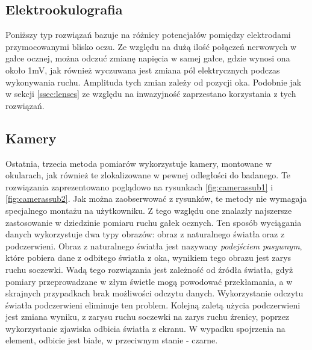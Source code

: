 \subsection{Elektrookulografia}
\label{ssec:eog}
Poniższy typ rozwiązań bazuje na różnicy potencjałów pomiędzy elektrodami przymocowanymi blisko oczu. Ze względu na dużą ilość połączeń nerwowych w gałce ocznej, można odczuć zmianę napięcia w samej gałce, gdzie wynosi ona około 1mV, jak również wyczuwana jest zmiana pól elektrycznych podczas wykonywania ruchu. Amplituda tych zmian zależy od pozycji oka. Podobnie jak w sekcji \ref{ssec:lenses} ze względu na inwazyjność zaprzestano korzystania z tych rozwiązań.
\subsection{Kamery}
\label{ssec:cameras}
Ostatnia, trzecia metoda pomiarów wykorzystuje kamery, montowane w okularach, jak również te zlokalizowane w pewnej odległości do badanego. Te rozwiązania zaprezentowano poglądowo na rysunkach \ref{fig:camerassub1} i \ref{fig:camerassub2}. Jak można zaobserwować z rysunków, te metody nie wymagaja specjalnego montażu na użytkowniku. Z tego względu one znalazły najszersze zastosowanie w dziedzinie pomiaru ruchu gałek ocznych. Ten sposób wyciągania danych wykorzystuje dwa typy obrazów: obraz z naturalnego światła oraz z podczerwieni. Obraz z naturalnego światła jest nazywany \emph{podejściem pasywnym}, które pobiera dane z odbitego światła z oka, wynikiem tego obrazu jest zarys ruchu soczewki. Wadą tego rozwiązania jest zależność od źródła światła, gdyż pomiary przeprowadzane w złym świetle mogą powodować przekłamania, a w skrajnych przypadkach brak możliwości odczytu danych. Wykorzystanie odczytu światła podczerwieni eliminuje ten problem. Kolejną zaletą użycia podczerwieni jest zmiana wyniku, z zarysu ruchu soczewki na zarys ruchu źrenicy, poprzez wykorzystanie zjawiska odbicia światła z ekranu. W wypadku spojrzenia na element, odbicie jest białe, w przeciwnym stanie - czarne.
